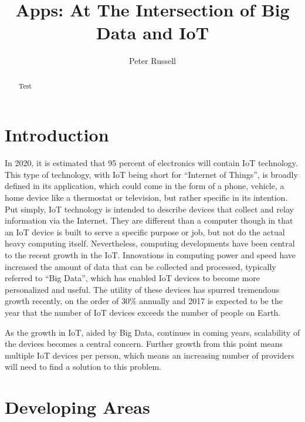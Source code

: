 \documentclass[sigconf]{acmart}
\begin{document}
\title{Apps: At The Intersection of Big Data and IoT }

\author{Peter Russell}

\begin{abstract}
Test
\end{abstract}


\maketitle


\section{Introduction}
In 2020, it is estimated that 95 percent of electronics will contain IoT technology. This type of technology, with IoT being short for ``Internet of Things'', is broadly defined in its application, which could come in the form of a phone, vehicle, a home device like a thermostat or television, but rather specific in its intention. Put simply, IoT technology is intended to describe devices that collect and relay information via the Internet. They are different than a computer though in that an IoT device is built to serve a specific purpose or job, but not do the actual heavy computing itself. Nevertheless, computing developments have been central to the recent growth in the IoT. Innovations in computing power and speed have increased the amount of data that can be collected and processed, typically referred to ``Big Data'', which has enabled IoT devices to become more personalized and useful. The utility of these devices has spurred tremendous growth recently, on the order of $30 \%$ annually and 2017 is expected to be the year that the number of IoT devices exceeds the number of people on Earth. %

As the growth in IoT, aided by Big Data, continues in coming years, scalability of the devices becomes a central concern. Further growth from this point means multiple IoT devices per person, which means an increasing number of providers will need to find a solution to this problem. 

\section{Developing Areas}
\end{document}
